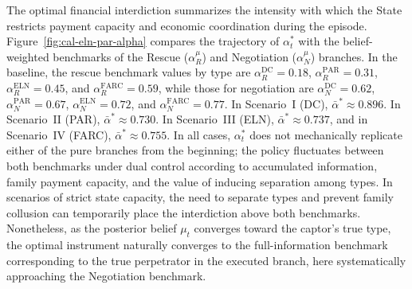 \documentclass[review,authoryear,12pt]{elsarticle}
\theoremstyle{plain}
\theoremstyle{definition}
\newcommand{\1}{\mathbf{1}}
\begin{document}
The optimal financial interdiction summarizes the intensity with which the State restricts payment capacity and economic coordination during the episode. Figure~\ref{fig:cal-eln-par-alpha} compares the trajectory of $\alpha_t^\ast$ with the belief-weighted benchmarks of the Rescue ($\alpha_R^\mu$) and Negotiation ($\alpha_N^\mu$) branches. In the baseline, the rescue benchmark values by type are $\alpha_R^{\mathrm{DC}}=0.18$, $\alpha_R^{\mathrm{PAR}}=0.31$, $\alpha_R^{\mathrm{ELN}}=0.45$, and $\alpha_R^{\mathrm{FARC}}=0.59$, while those for negotiation are $\alpha_N^{\mathrm{DC}}=0.62$, $\alpha_N^{\mathrm{PAR}}=0.67$, $\alpha_N^{\mathrm{ELN}}=0.72$, and $\alpha_N^{\mathrm{FARC}}=0.77$. In Scenario~I (DC), $\bar\alpha^\ast\approx 0.896$. In Scenario~II (PAR), $\bar\alpha^\ast\approx 0.730$. In Scenario~III (ELN), $\bar\alpha^\ast\approx 0.737$, and in Scenario~IV (FARC), $\bar\alpha^\ast\approx 0.755$. In all cases, $\alpha_t^\ast$ does not mechanically replicate either of the pure branches from the beginning; the policy fluctuates between both benchmarks under dual control according to accumulated information, family payment capacity, and the value of inducing separation among types. In scenarios of strict state capacity, the need to separate types and prevent family collusion can temporarily place the interdiction above both benchmarks. Nonetheless, as the posterior belief $\mu_t$ converges toward the captor's true type, the optimal instrument naturally converges to the full-information benchmark corresponding to the true perpetrator in the executed branch, here systematically approaching the Negotiation benchmark.
\end{document}
